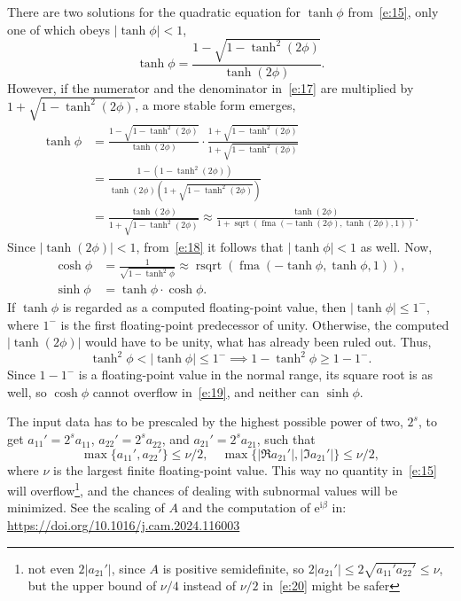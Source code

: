 \documentclass[a4paper,12pt,twoside]{article}
\begin{document}
There are two solutions for the quadratic equation for $\tanh\phi$
from~\eqref{e:15}, only one of which obeys $|\tanh\phi|<1$,
\begin{equation}
  \tanh\phi=\frac{1-\sqrt{1-\tanh^2(2\phi)}}{\tanh(2\phi)}.
  \label{e:17}
\end{equation}
However, if the numerator and the denominator in~\eqref{e:17} are
multiplied by $1+\sqrt{1-\tanh^2(2\phi)}$, a more stable form emerges,
\begin{equation}
  \begin{split}
    \tanh\phi&=\frac{1-\sqrt{1-\tanh^2(2\phi)}}{\tanh(2\phi)}\cdot\frac{1+\sqrt{1-\tanh^2(2\phi)}}{1+\sqrt{1-\tanh^2(2\phi)}}\\
    &=\frac{1-(1-\tanh^2(2\phi))}{\tanh(2\phi)\left(1+\sqrt{1-\tanh^2(2\phi)}\right)}\\
    &=\frac{\tanh(2\phi)}{1+\sqrt{1-\tanh^2(2\phi)}}\approx\frac{\tanh(2\phi)}{1+\mathop{\mathrm{sqrt}}(\mathop{\mathrm{fma}}(-\tanh(2\phi),\tanh(2\phi),1))}.
  \end{split}
  \label{e:18}
\end{equation}
Since $|\tanh(2\phi)|<1$, from~\eqref{e:18} it follows that
$|\tanh\phi|<1$ as well.  Now,
\begin{equation}
  \begin{aligned}
    \cosh\phi&=\frac{1}{\sqrt{1-\tanh^2\phi}}\approx\mathop{\mathrm{rsqrt}}(\mathop{\mathrm{fma}}(-\tanh\phi,\tanh\phi,1)),\\
    \sinh\phi&=\tanh\phi\cdot\cosh\phi.
  \end{aligned}
  \label{e:19}
\end{equation}
If $\tanh\phi$ is regarded as a computed floating-point value, then
$|\tanh\phi|\le 1^-$, where $1^-$ is the first floating-point
predecessor of unity.  Otherwise, the computed $|\tanh(2\phi)|$ would
have to be unity, what has already been ruled out.  Thus,
\begin{displaymath}
  \tanh^2\phi<|\tanh\phi|\le 1^-\implies 1-\tanh^2\phi\ge 1-1^-.
\end{displaymath}
Since $1-1^-$ is a floating-point value in the normal range, its
square root is as well, so $\cosh\phi$ cannot overflow
in~\eqref{e:19}, and neither can $\sinh\phi$.

The input data has to be prescaled by the highest possible power of
two, $2^s$, to get $a_{11}'=2^s a_{11}^{}$, $a_{22}'=2^s a_{22}^{}$,
and $a_{21}'=2^s a_{21}^{}$, such that
\begin{equation}
  \max\{a_{11}',a_{22}'\}\le\nu/2,\quad
  \max\{|\Re{a_{21}'}|,|\Im{a_{21}'}|\}\le\nu/2,
  \label{e:20}
\end{equation}
where $\nu$ is the largest finite floating-point value.  This way no
quantity in~\eqref{e:15} will overflow\footnote{not even $2|a_{21}'|$,
since $A$ is positive semidefinite, so
$2|a_{21}'|\le 2\sqrt{a_{11}'a_{22}'}\le\nu$, but the upper bound of
$\nu/4$ instead of $\nu/2$ in~\eqref{e:20} might be safer}, and the
chances of dealing with subnormal values will be minimized.  See the
scaling of $A$ and the computation of $\mathrm{e}^{\mathrm{i}\beta}$
in:\\\url{https://doi.org/10.1016/j.cam.2024.116003}
\end{document}
